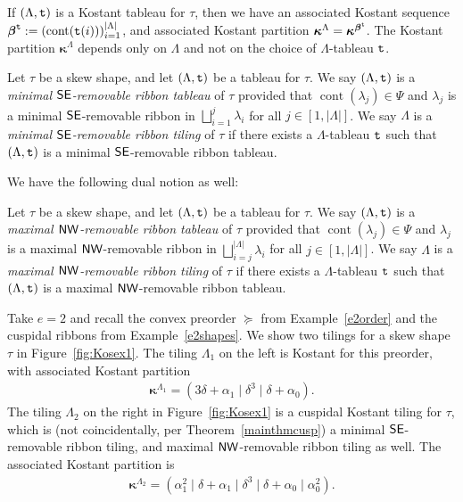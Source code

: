 \documentclass[Unicode,ALCO]{cedram}
\newcommand{\0}{{\bar 0}}
\newcommand{\ttt}{{\tt t}}
\newcommand{\nnww}{{\sf NW}}
\newcommand{\ssee}{{\sf SE}}
\newcommand{\bkap}{\boldsymbol{\kappa}}
\newcommand{\bbeta}{\boldsymbol{\beta}}
\def\cont{{\operatorname{cont}}}
\begin{document}
If \((\Lambda,\ttt)\) is a Kostant tableau for \(\tau\), then we have an associated Kostant sequence \(\bbeta^{\ttt}:= (\cont(\ttt(i)))_{i=1}^{|\Lambda|}\), and associated Kostant partition \(\bkap^\Lambda = \bkap^{\bbeta^{\ttt}}\). The Kostant partition \(\bkap^\Lambda\) depends only on \(\Lambda\) and not on the choice of \(\Lambda\)-tableau \(\ttt\).

\begin{defi}
Let \(\tau\) be a skew shape, and let \((\Lambda,\ttt)\) be a tableau for \(\tau\). 
We say \((\Lambda,\ttt)\) is a {\em minimal \(\ssee\)-removable ribbon tableau} of \(\tau\) provided that \(\cont(\lambda_j) \in \Psi\) and \(\lambda_j\) is a minimal \(\ssee\)-removable ribbon in \(\bigsqcup_{i=1}^j \lambda_i\) for all \(j \in [1, |\Lambda|]\). We say \(\Lambda\) is a {\em minimal \(\ssee\)-removable ribbon tiling} of \(\tau\) if there exists a \(\Lambda\)-tableau \(\ttt\) such that \((\Lambda, \ttt)\) is a minimal \(\ssee\)-removable ribbon tableau.
\end{defi}

We have the following dual notion as well:

\begin{defi}
Let \(\tau\) be a skew shape, and let \((\Lambda,\ttt)\) be a tableau for \(\tau\). 
We say \((\Lambda,\ttt)\) is a {\em maximal \(\nnww\)-removable ribbon tableau} of \(\tau\) provided that \(\cont(\lambda_j) \in \Psi\) and \(\lambda_j\) is a maximal \(\nnww\)-removable ribbon in \(\bigsqcup_{i=j}^{|\Lambda|} \lambda_i\) for all \(j \in [1, |\Lambda|]\). We say \(\Lambda\) is a {\em maximal \(\nnww\)-removable ribbon tiling} of \(\tau\) if there exists a \(\Lambda\)-tableau \(\ttt\) such that \((\Lambda, \ttt)\) is a maximal \(\nnww\)-removable ribbon tableau.
\end{defi}

\begin{exam}\label{e2Kosex}
Take \(e=2\) and recall the convex preorder \(\succeq\) from Example~\ref{e2order} and the cuspidal ribbons from Example~\ref{e2shapes}. We show two tilings for a skew shape \(\tau\) in Figure~\ref{fig:Kosex1}. The tiling \(\Lambda_1\) on the left is Kostant for this preorder, with associated Kostant partition
\begin{align*}
\bkap^{\Lambda_1} = ( 3\delta + \alpha_1 \mid  \delta^3 \mid \delta + \alpha_0).
\end{align*}
The tiling \(\Lambda_2\) on the right in Figure~\ref{fig:Kosex1} is a cuspidal Kostant tiling for \(\tau\), which is (not coincidentally, per Theorem~\ref{mainthmcusp}) a minimal \(\ssee\)-removable ribbon tiling, and maximal \(\nnww\)-removable ribbon tiling as well. The associated Kostant partition is
\begin{align*}
\bkap^{\Lambda_2} = (\alpha_1^2 \mid \delta + \alpha_1 \mid  \delta^3 \mid \delta + \alpha_0 \mid \alpha_0^2).
\end{align*}
\end{exam}
\end{document}
